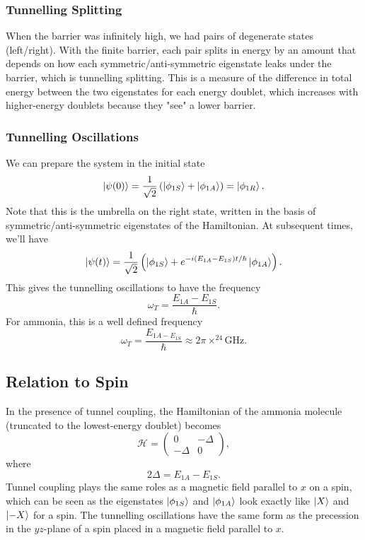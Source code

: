 \documentclass{article}
\begin{document}
\subsubsection{Tunnelling Splitting}
When the barrier was infinitely high, we had pairs of degenerate states (left/right). With the finite barrier, each pair splits in energy by an amount that depends on how each symmetric/anti-symmetric eigenstate leaks under the barrier, which is tunnelling splitting. This is a measure of the difference in total energy between the two eigenstates for each energy doublet, which increases with higher-energy doublets because they "see" a lower barrier.

\subsubsection{Tunnelling Oscillations}
We can prepare the system in the initial state
\[
    \ket{\psi (0)}=\frac{1}{\sqrt{2}}\left( \ket{\phi _{1S}}+\ket{\phi _{1A}} \right)=\ket{\phi _{1R}}.
\]
Note that this is the umbrella on the right state, written in the basis of symmetric/anti-symmetric eigenstates of the Hamiltonian. At subsequent times, we'll have
\[
    \ket{\psi (t)}=\frac{1}{\sqrt{2}}\left( \ket{\phi _{1S}}+e^{-i(E_{1A}-E_{1S})t/\hbar}\ket{\phi _{1A}} \right).
\]
This gives the tunnelling oscillations to have the frequency
\[
    \omega _T=\frac{E_{1A}-E_{1S}}{\hbar}.
\]
For ammonia, this is a well defined frequency
\[
    \omega _T=\frac{E_{1A-E_{1S}}}{\hbar}\approx 2\pi \times^24 \text{GHz}.
\]

\subsection{Relation to Spin}
In the presence of tunnel coupling, the Hamiltonian of the ammonia molecule (truncated to the lowest-energy doublet) becomes
\[
   \mathcal{H}=\begin{pmatrix}
        0 & -\Delta \\ -\Delta & 0
    \end{pmatrix},
\]
where
\[
    2\Delta =E_{1A}-E_{1S}.
\]
Tunnel coupling plays the same roles as a magnetic field parallel to $x$ on a spin, which can be seen as the eigenstates $\ket{\phi _{1S}}$ and $\ket{\phi _{1A}}$ look exactly like $\ket{X}$ and $\ket{-X}$ for a spin. The tunnelling oscillations have the same form as the precession in the $yz$-plane of a spin placed in a magnetic field parallel to $x$.
\end{document}
